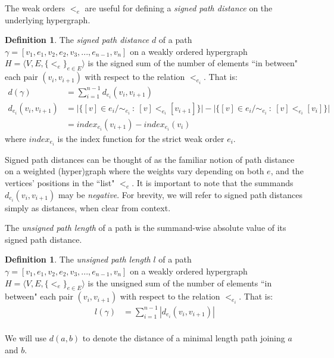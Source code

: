 \documentclass{article}
\theoremstyle{plain}
\theoremstyle{definition}
\newtheorem{definition}[theorem]{Definition}
\theoremstyle{remark}
\begin{document}
The weak orders $<_e$ are useful for defining a \textit{signed path distance} on the underlying hypergraph.
\begin{definition}
	The \textit{signed path distance} $d$ of a path $\gamma = [v_1, e_1, v_2, e_2, v_3, ..., e_{n-1}, v_n]$ on a weakly ordered hypergraph $H = \langle V, E, \{<_e\}_{e \in E} \rangle$ is the signed sum of the number of elements ``in between" each pair $(v_i, v_{i+1})$ with respect to the relation $<_{e_i}$. That is:
	\begin{equation*}
		\begin{aligned}
			d(\gamma) &= \sum_{i = 1}^{n - 1} d_{e_i}(v_i, v_{i+1})\\
			d_{e_i}(v_i, v_{i+1}) &= \bigg| \big\{ [v] \in e_i / \sim_{e_i} \ : \ [v] <_{e_i} [v_{i+1}] \big\} \bigg| - \bigg| \big\{ [v] \in e_i / \sim_{e_i} \ : \ [v] <_{e_i} [v_{i}] \big\} \bigg|\\
			&= index_{e_i}(v_{i+1}) - index_{e_i}(v_i)
		\end{aligned}
	\end{equation*}
	where $index_{e_i}$ is the index function for the strict weak order $e_i$.
\end{definition}
Signed path distances can be thought of as the familiar notion of path distance on a weighted (hyper)graph where the weights vary depending on both $e$, and the vertices' positions in the ``list" $<_e$. It is important to note that the summands $d_{e_i}(v_i, v_{i+1})$ may be \textit{negative}. For brevity, we will refer to signed path distances simply as distances, when clear from context.

The \textit{unsigned path length} of a path is the summand-wise absolute value of its signed path distance.
\begin{definition}
	The \textit{unsigned path length} $l$ of a path $\gamma = [v_1, e_1, v_2, e_2, v_3, ..., e_{n-1}, v_n]$ on a weakly ordered hypergraph $H = \langle V, E, \{<_e\}_{e \in E} \rangle$ is the unsigned sum of the number of elements ``in between" each pair $(v_i, v_{i+1})$ with respect to the relation $<_{e_i}$. That is:
	\begin{equation*}
		\begin{aligned}
			l(\gamma) &= \sum_{i = 1}^{n - 1} |d_{e_i}(v_i, v_{i+1})|\\
		\end{aligned}
	\end{equation*}
\end{definition}

We will use $d(a,b)$ to denote the distance of a minimal length path joining $a$ and $b$.
\end{document}
